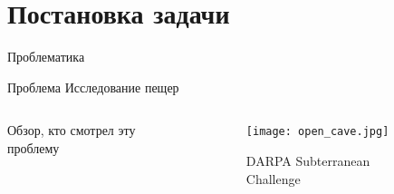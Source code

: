\section{Постановка задачи}

\begin{frame}[t]{Проблематика}
    \begin{block}{Проблема}
        Исследование пещер
    \end{block}
    \begin{columns}[T,onlytextwidth]
        \begin{column}{0.59\textwidth}
            Обзор, кто смотрел эту проблему
        \end{column}
        \begin{column}{0.39\textwidth}
            \begin{figure}[H]
                \centering\texttt{[image: open\_cave.jpg]}
                \caption*{DARPA Subterranean Challenge}
            \end{figure}
        \end{column}
    \end{columns}
\end{frame}


